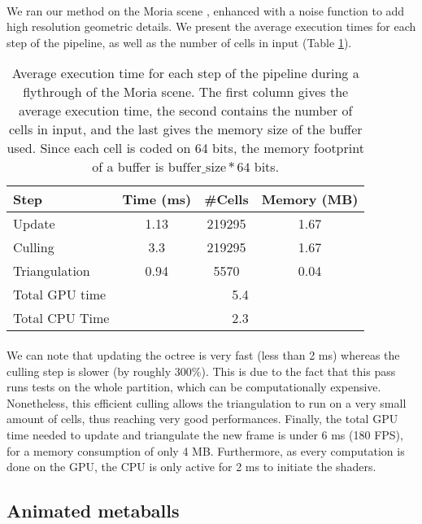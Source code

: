 \paragraph{}
We ran our method on the Moria scene \cite{peytavie2009arches}, enhanced with a noise function to add high resolution geometric details.
We present the average execution times for each step of the pipeline, as well as the number of cells in input (Table \ref{table_step}).

\begin{table}[tb]
\centering
\begin{tabular}{|l|c|c|c|}
\hline
Step           & Time (ms) & \#Cells & Memory (MB) \\ \hline
Update         & 1.13      & 219295  & 1.67        \\
Culling        & 3.3       & 219295  & 1.67        \\
Triangulation  & 0.94      & 5570    & 0.04        \\ \hline
Total GPU time & \multicolumn{3}{c|}{5.4}           \\ 
Total CPU Time & \multicolumn{3}{c|}{2.3}          \\ \hline
\end{tabular}
\caption{Average execution time for each step of the pipeline during a flythrough of the Moria scene.
The first column gives the average execution time, 
the second contains the number of cells in input, and
the last gives the memory size of the buffer used.
Since each cell is coded on 64 bits, the memory footprint of a buffer is $\mathrm{buffer\_size} * 64$ bits.}
\label{table_step}
\end{table}

\paragraph{}
We can note that updating the octree is very fast (less than 2 ms) whereas the culling step is slower (by roughly 300\%).
This is due to the fact that this pass runs tests on the whole partition, which can be computationally expensive.
Nonetheless, this efficient culling allows the triangulation to run on a very small amount of cells, thus reaching very good performances.
Finally, the total GPU time needed to update and triangulate the new frame is under 6 ms (180 FPS), for a memory consumption of only 4 MB.
Furthermore, as every computation is done on the GPU, the CPU is only active for 2 ms to initiate the shaders.

\subsection{Animated metaballs}

